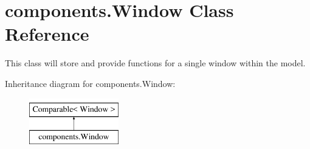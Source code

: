 \hypertarget{classcomponents_1_1_window}{}\section{components.\+Window Class Reference}
\label{classcomponents_1_1_window}


This class will store and provide functions for a single window within the model.  


Inheritance diagram for components.\+Window\+:\begin{figure}[H]
\begin{center}
\leavevmode
\includegraphics[height=2.000000cm]{classcomponents_1_1_window}
\end{center}
\end{figure}
